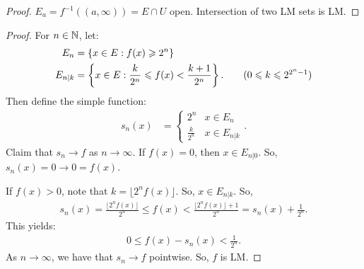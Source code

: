 \documentclass{report}
\begin{document}


\cor{}{$E\subseteq \RR^N$ LM, $f: E \to [0, \infty)$ continuous. Then $f$ is LM.}
\begin{proof}
    $E_a = f^{-1}((a, \infty)) = E \cap U$ open. Intersection of two LM sets is LM.
\end{proof}
\begin{proof}
    For $n \in \NN$, let:
    \begin{align*}
        E_n &= \{ x \in E: f(x) \geq 2^n\} \\
        E_{n | k} &= \left\{ x\in E :  \frac{k}{2^n} \leq f(x) < \frac{k+1}{2^n}\right\}. \tag{$0 \leq k \leq 2^{2^n - 1}$}
    \end{align*}
    Then define the simple function:
    \begin{align*}
        s_n(x) &= \begin{cases} 2^n & x \in E_n \\ \frac{k}{2^n} & x \in E_{n | k}\end{cases}.
    \end{align*}
    Claim that $s_n \to f$ as $n \to \infty$. If $f(x) = 0$, then $x \in E_{n|0}$. So, $s_n(x) = 0 \to 0 = f(x)$.

    If $f(x) > 0$, note that $k = \lfloor 2^nf(x) \rfloor$. So, $x \in E_{n|k}$. So, 
    \begin{align*}
        s_n(x) = \frac{\lfloor 2^nf(x) \rfloor}{2^n} \leq f(x) < \frac{\lfloor 2^nf(x) \rfloor + 1}{2^n} = s_n(x) + \frac{1}{2^n}.
    \end{align*}
    This yields:
    \begin{align*}
        0 \leq f(x) - s_n(x) < \frac{1}{2^n}.
    \end{align*}
    As $n\to \infty$, we have that $s_n \to f$ pointwise. So, $f$ is LM.
\end{proof}
\end{document}
